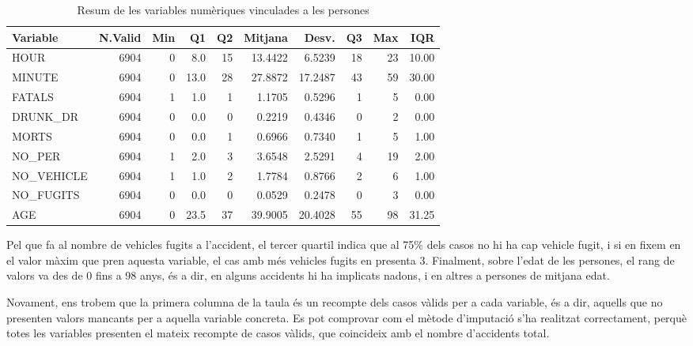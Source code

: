 \documentclass[12pt,longbibliography]{article}
\theoremstyle{definition}
\theoremstyle{remark}
\begin{document}
\begin{table}[H]
\centering
\begin{tabular}{lrrrrrrrrr}
\hline
Variable    & N.Valid & Min & Q1   & Q2 & Mitjana    & Desv. & Q3 & Max & IQR   \\ \hline
HOUR        & 6904    & 0   & 8.0  & 15      & 13.4422 & 6.5239       & 18 & 23  & 10.00 \\ \hline
MINUTE      & 6904    & 0   & 13.0 & 28      & 27.8872 & 17.2487      & 43 & 59  & 30.00 \\ \hline
FATALS      & 6904    & 1   & 1.0  & 1       & 1.1705  & 0.5296       & 1  & 5   & 0.00  \\ \hline
DRUNK\_DR   & 6904    & 0   & 0.0  & 0       & 0.2219  & 0.4346       & 0  & 2   & 0.00  \\ \hline
MORTS       & 6904    & 0   & 0.0  & 1       & 0.6966  & 0.7340       & 1  & 5   & 1.00  \\ \hline
NO\_PER     & 6904    & 1   & 2.0  & 3       & 3.6548  & 2.5291       & 4  & 19  & 2.00  \\ \hline
NO\_VEHICLE & 6904    & 1   & 1.0  & 2       & 1.7784  & 0.8766       & 2  & 6   & 1.00  \\ \hline
NO\_FUGITS  & 6904    & 0   & 0.0  & 0       & 0.0529  & 0.2478       & 0  & 3   & 0.00  \\ \hline
AGE         & 6904    & 0   & 23.5 & 37      & 39.9005 & 20.4028      & 55 & 98  & 31.25 \\ \hline
\end{tabular}
\caption{Resum de les variables numèriques vinculades a les persones}
\label{tab:num4-table}
\end{table}




Pel que fa al nombre de vehicles fugits a l'accident, el tercer quartil indica que al 75\% dels casos no hi ha cap vehicle fugit, i si en fixem en el valor màxim que pren aquesta variable, el cas amb més vehicles fugits en presenta 3. Finalment, sobre l'edat de les persones, el rang de valors va des de 0 fins a 98 anys, és a dir, en alguns accidents hi ha implicats nadons, i en altres a persones de mitjana edat. 

Novament, ens trobem que la primera columna de la taula és un recompte dels casos vàlids per a cada variable, és a dir, aquells que no presenten valors mancants per a aquella variable concreta. Es pot comprovar com el mètode d'imputació s'ha realitzat correctament, perquè totes les variables presenten el mateix recompte de casos vàlids, que coincideix amb el nombre d'accidents total.
\end{document}
